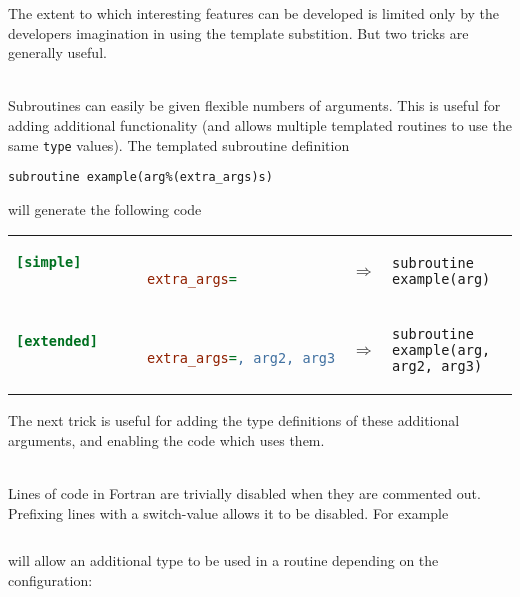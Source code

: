 \documentclass[a4paper,notitlepage]{scrreprt}
\newcommand\headitem[1]{\needspace{1.5\baselineskip}\item[{\boldmath #1 \nopagebreak}] \hfill \\ \nopagebreak}
\let\code\lstinline
\begin{document}
{{	The extent to which interesting features can be developed is limited only
	by the developers imagination in using the template substition. But two
	tricks are generally useful.

		\begin{description}
		\headitem{Additional optional arguments}
			Subroutines can easily be given flexible numbers of arguments. This
			is useful for adding additional functionality (and allows multiple
			templated routines to use the same \code{type} values). The
			templated subroutine definition
			\begin{lstlisting}[gobble=12]
				subroutine example(arg%(extra_args)s)
			\end{lstlisting}
			will generate the following code

			\begin{minipage}{\textwidth}
			\begin{tabular}{lcl}
			\begin{lstlisting}[language=ini,gobble=16]
				[simple]
				extra_args=
			\end{lstlisting}
			& $\Longrightarrow$ &
			\begin{lstlisting}[gobble=16]
				subroutine example(arg)
			\end{lstlisting} \\[1.5em]

			\begin{lstlisting}[language=ini,gobble=16]
				[extended]
				extra_args=, arg2, arg3
			\end{lstlisting}

			& $\Longrightarrow$ &
			\begin{lstlisting}[gobble=16]
				subroutine example(arg, arg2, arg3)
			\end{lstlisting}
			\end{tabular}
			\end{minipage}

			The next trick is useful for adding the type definitions of these
			additional arguments, and enabling the code which uses them.

		\headitem{Switching off lines of code}
			Lines of code in Fortran are trivially disabled when they are
			commented out. Prefixing lines with a switch-value allows it to be
			disabled. For example
			\begin{lstlisting}[gobble=12]
				%(use_type2)%(type2) :: val()
			\end{lstlisting}
			will allow an additional type to be used in a routine depending on
			the configuration:


\end{description}}}
\end{document}
